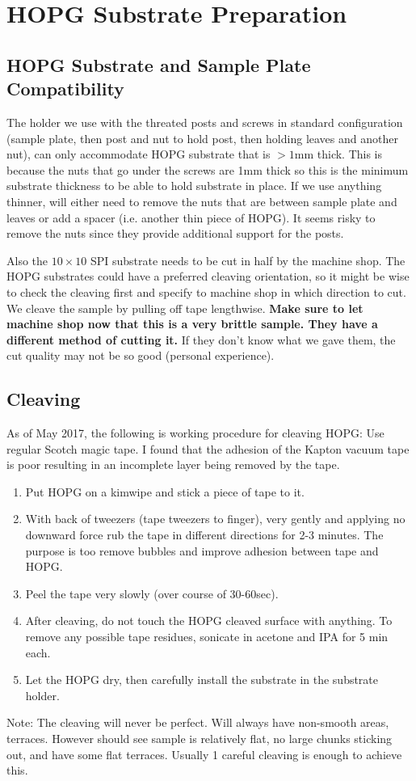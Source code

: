 \chapter{HOPG Substrate Preparation}
\section{HOPG Substrate and Sample Plate Compatibility}
The holder we use with the threated posts and screws in standard configuration (sample plate, then post and nut to hold post, then holding leaves and another nut), can only accommodate HOPG substrate that is $>1$mm thick. This is because the nuts that go under the screws are 1mm thick so this is the minimum substrate thickness to be able to hold substrate in place. If we use anything thinner, will either need to remove the nuts that are between sample plate and leaves or add a spacer (i.e. another thin piece of HOPG). It seems risky to remove the  nuts since they provide additional support for the posts.

Also the $10\times10$ SPI substrate needs to be cut in half by the machine shop. The HOPG substrates could have a preferred cleaving orientation, so it might be wise to check the cleaving first and specify to machine shop in which direction to cut. We cleave the sample by pulling off tape lengthwise. \textbf{Make sure to let machine shop now that this is a very brittle sample. They have a different method of cutting it.} If they don't know what we gave them, the cut quality may not be so good (personal experience).

\section{Cleaving}
As of May 2017, the following is working procedure for cleaving HOPG:
Use regular Scotch magic tape. I found that the adhesion of the Kapton vacuum tape is poor resulting in an incomplete layer being removed by the tape.
\begin{enumerate}
\item	Put HOPG on a kimwipe and stick a piece of tape to it.
\item	With back of tweezers (tape tweezers to finger), very gently and applying no downward force rub the tape in different directions for 2-3 minutes. The purpose is too remove bubbles and improve adhesion between tape and HOPG.
\item	Peel the tape very slowly (over course of 30-60sec).
\item	After cleaving, do not touch the HOPG cleaved surface with anything. To remove any possible tape residues, sonicate in acetone and IPA for 5 min each.
\item	Let the HOPG dry, then carefully install the substrate in the substrate holder.\\
\end{enumerate}
Note: The cleaving will never be perfect. Will always have non-smooth areas, terraces. However should see sample is relatively flat, no large chunks sticking out, and have some flat terraces. Usually 1 careful cleaving is enough to achieve this.
